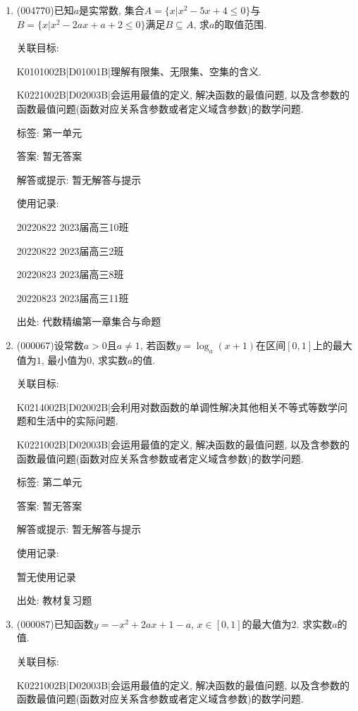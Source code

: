 \documentclass[10pt,a4paper]{article}
\begin{document}
\begin{enumerate}[1.]

\item { (004770)}已知$a$是实常数, 集合$A=\{x|x^2-5x+4\le 0\}$与$B=\{x|x^2-2ax+a+2\le 0\}$满足$B\subseteq A$, 求$a$的取值范围.


关联目标:

K0101002B|D01001B|理解有限集、无限集、空集的含义.

K0221002B|D02003B|会运用最值的定义, 解决函数的最值问题, 以及含参数的函数最值问题(函数对应关系含参数或者定义域含参数)的数学问题.



标签: 第一单元

答案: 暂无答案

解答或提示: 暂无解答与提示

使用记录:

20220822	2023届高三10班	

20220822	2023届高三2班	

20220823	2023届高三8班	

20220823	2023届高三11班	


出处: 代数精编第一章集合与命题
\item { (000067)}设常数$a>0$且$a\ne 1$, 若函数$y=\log_a(x+1)$在区间$[0, 1]$上的最大值为$1$, 最小值为$0$, 求实数$a$的值.


关联目标:

K0214002B|D02002B|会利用对数函数的单调性解决其他相关不等式等数学问题和生活中的实际问题.

K0221002B|D02003B|会运用最值的定义, 解决函数的最值问题, 以及含参数的函数最值问题(函数对应关系含参数或者定义域含参数)的数学问题.



标签: 第二单元

答案: 暂无答案

解答或提示: 暂无解答与提示

使用记录:

暂无使用记录


出处: 教材复习题
\item { (000087)}已知函数$y=-x^2+2ax+1-a$, $x\in [0, 1]$的最大值为$2$. 求实数$a$的值.


关联目标:

K0221002B|D02003B|会运用最值的定义, 解决函数的最值问题, 以及含参数的函数最值问题(函数对应关系含参数或者定义域含参数)的数学问题.




\end{enumerate}
\end{document}
